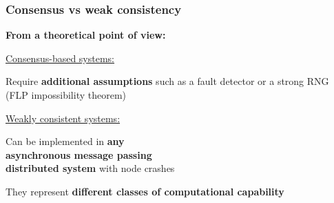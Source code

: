 \documentclass[aspectratio=169]{beamer}
\begin{document}
\begin{frame}
	\frametitle{Consensus vs weak consistency}
	\begin{center}
		\textbf{From a theoretical point of view:}\\

	\end{center}
	\vspace{2em}

	\hspace{1em}
	\begin{minipage}{6.5cm}
		\underline{Consensus-based systems:}

		\vspace{1em}

		Require \textbf{additional assumptions} such as a fault detector or a strong RNG\\
		(FLP impossibility theorem)
	\end{minipage}
	\hfill
	\begin{minipage}{6.5cm}
		\underline{Weakly consistent systems:}

		\vspace{1em}
		
		Can be implemented in \textbf{any\\asynchronous message passing\\distributed system} with node crashes
	\end{minipage}
	\hspace{1em}

	\vspace{3em}
	\begin{center}
		They represent \textbf{different classes of computational capability}\\
	\end{center}
\end{frame}
\end{document}
